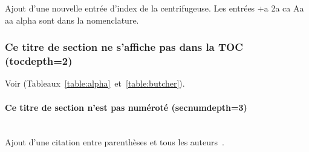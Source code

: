 		Ajout d'une nouvelle entrée d'index de la centrifugeuse. Les entrées \gls{+a} \gls{2a} \gls{ca} \gls{Aa} \gls{aa} \gls{alpha} {\NoAutoSpaceBeforeFDP}sont dans la nomenclature.

		\subsubsection{Ce titre de section ne s'affiche pas dans la TOC (tocdepth=2)}

		Voir (Tableaux~\ref{table:alpha}~et~\ref{table:butcher}).

			\paragraph{Ce titre de section n'est pas numéroté (secnumdepth=3)}~~\\ %

			Ajout d'une citation entre parenthèses et tous les auteurs~\parencite{zohdy_mapping_2012}.
